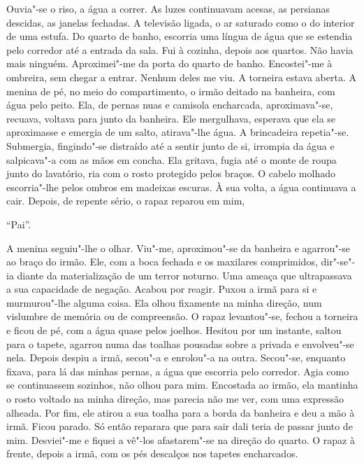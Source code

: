 Ouvia"-se o riso, a água a correr. As luzes continuavam acesas, as
persianas descidas, as janelas fechadas. A televisão ligada, o ar saturado
como o do interior de uma estufa. Do quarto de banho, escorria uma
língua de água que se estendia pelo corredor até a entrada da sala. Fui
à cozinha, depois aos quartos. Não havia mais ninguém. Aproximei"-me da
porta do quarto de banho. Encostei"-me à ombreira, sem chegar a entrar.
Nenhum deles me viu. A torneira estava aberta. A menina de pé, no meio
do compartimento, o irmão deitado na banheira, com água pelo peito. Ela,
de pernas nuas e camisola encharcada, aproximava"-se, recuava, voltava
para junto da banheira. Ele mergulhava, esperava que ela se aproximasse
e emergia de um salto, atirava"-lhe água. A brincadeira repetia"-se.
Submergia, fingindo"-se distraído até a sentir junto de si, irrompia da
água e salpicava"-a com as mãos em concha. Ela gritava, fugia até o
monte de roupa junto do lavatório, ria com o rosto protegido pelos
braços. O cabelo molhado escorria"-lhe pelos ombros em madeixas escuras.
À sua volta, a água continuava a cair. Depois, de repente sério, o rapaz
reparou em mim,

``Pai''.

A menina seguiu"-lhe o olhar. Viu"-me, aproximou"-se da banheira e
agarrou"-se ao braço do irmão. Ele, com a boca fechada e os maxilares
comprimidos, dir"-se"-ia diante da materialização de um terror noturno.
Uma ameaça que ultrapassava a sua capacidade de negação. Acabou por
reagir. Puxou a irmã para si e murmurou"-lhe alguma coisa. Ela olhou
fixamente na minha direção, num vislumbre de memória ou de compreensão.
O rapaz levantou"-se, fechou a torneira e ficou de pé, com a água quase
pelos joelhos. Hesitou por um instante, saltou para o tapete, agarrou
numa das toalhas pousadas sobre a privada e envolveu"-se nela. Depois
despiu a irmã, secou"-a e enrolou"-a na outra. Secou"-se, enquanto
fixava, para lá das minhas pernas, a água que escorria pelo corredor.
Agia como se continuassem sozinhos, não olhou para mim. Encostada ao
irmão, ela mantinha o rosto voltado na minha direção, mas parecia não
me ver, com uma expressão alheada. Por fim, ele atirou a sua toalha para
a borda da banheira e deu a mão à irmã. Ficou parado. Só então reparara
que para sair dali teria de passar junto de mim. Desviei"-me e fiquei a
vê"-los afastarem"-se na direção do quarto. O rapaz à frente, depois a
irmã, com os pés descalços nos tapetes encharcados.

